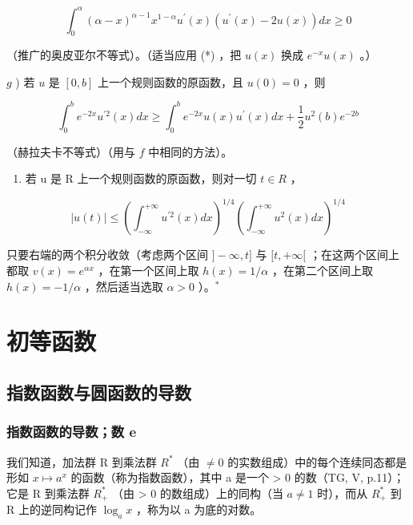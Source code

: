 \[
\int_ {0} ^ {\alpha} (\alpha - x) ^ {\alpha - 1} x ^ {1 - \alpha} u ^ {\prime} (x) \left(u ^ {\prime} (x) - 2 u (x)\right) d x \geqslant 0
\]

（推广的奥皮亚尔不等式）。（适当应用 (*) ，把 \(u(x)\) 换成 \(e^{-x}u(x)\) 。）

\(g\) ) 若 \(u\) 是 \([0,b]\) 上一个规则函数的原函数，且 \(u(0) = 0\) ，则

\[
\int_ {0} ^ {b} e ^ {- 2 x} u ^ {\prime 2} (x) d x \geqslant \int_ {0} ^ {b} e ^ {- 2 x} u (x) u ^ {\prime} (x) d x + \frac {1}{2} u ^ {2} (b) e ^ {- 2 b}
\]

（赫拉夫卡不等式）（用与 \(f\) 中相同的方法）。

\begin{enumerate}
\def\labelenumi{\alph{enumi})}
\setcounter{enumi}{7}
\tightlist
\item
  若 u 是 R 上一个规则函数的原函数，则对一切 \(t \in R\) ，
\end{enumerate}

\[
| u (t) | \leqslant \left(\int_ {- \infty} ^ {+ \infty} u ^ {\prime 2} (x) d x\right) ^ {1 / 4} \left(\int_ {- \infty} ^ {+ \infty} u ^ {2} (x) d x\right) ^ {1 / 4}
\]

只要右端的两个积分收敛（考虑两个区间 \(]-\infty,t]\) 与 \([t,+\infty[\) ；在这两个区间上都取 \(v(x)=e^{\alpha x}\) ，在第一个区间上取 \(h(x)=1/\alpha\) ，在第二个区间上取 \(h(x)=-1/\alpha\) ，然后适当选取 \(\alpha>0\) ）。\(^{*}\)

\chapter{初等函数}

\section{指数函数与圆函数的导数}

\subsection{指数函数的导数；数 e}

我们知道，加法群 R 到乘法群 \(R^{*}\) （由 \(\neq 0\) 的实数组成）中的每个连续同态都是形如 \(x \mapsto a^{x}\) 的函数（称为指数函数），其中 a 是一个 \textgreater{} 0 的数（TG, V, p.11）；它是 R 到乘法群 \(R_{+}^{*}\) （由 \textgreater{} 0 的数组成）上的同构（当 \(a \neq 1\) 时），而从 \(R_{+}^{*}\) 到 R 上的逆同构记作 \(\log_{a} x\) ，称为以 a 为底的对数。

